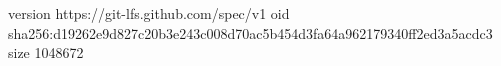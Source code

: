 version https://git-lfs.github.com/spec/v1
oid sha256:d19262e9d827c20b3e243c008d70ac5b454d3fa64a962179340ff2ed3a5acdc3
size 1048672
